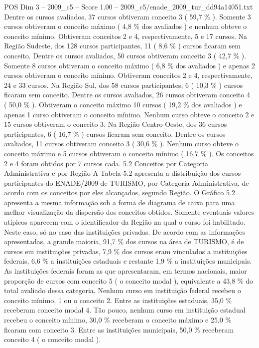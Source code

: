 \begin{textsample}{POS Dim 3 – 2009\_c5 – Score 1.00 – 2009\_c5/enade\_2009\_tur\_dd94a14051.txt}
Dentre os cursos avaliados, 37 cursos obtiveram conceito 3 ( 59,7 \% ).
Somente 3 cursos obtiveram o conceito máximo ( 4,8 \% dos avaliados ) e nenhum obteve o conceito mínimo.
Obtiveram conceitos 2 e 4, respectivamente, 5 e 17 cursos.
Na Região Sudeste, dos 128 cursos participantes, 11 ( 8,6 \% ) cursos ficaram sem conceito.
Dentre os cursos avaliados, 50 cursos obtiveram conceito 3 ( 42,7 \% ).
Somente 8 cursos obtiveram o conceito máximo ( 6,8 \% dos avaliados ) e apenas 2 cursos obtiveram o conceito mínimo.
Obtiveram conceitos 2 e 4, respectivamente, 24 e 33 cursos.
Na Região Sul, dos 58 cursos participantes, 6 ( 10,3 \% ) cursos ficaram sem conceito.
Dentre os cursos avaliados, 26 cursos obtiveram conceito 4 ( 50,0 \% ).
Obtiveram o conceito máximo 10 cursos ( 19,2 \% dos avaliados ) e apenas 1 curso obtiveram o conceito mínimo.
Nenhum curso obteve o conceito 2 e 15 cursos obtiveram o conceito 3.
Na Região Centro-Oeste, dos 36 cursos participantes, 6 ( 16,7 \% ) cursos ficaram sem conceito.
Dentre os cursos avaliados, 11 cursos obtiveram conceito 3 ( 30,6 \% ).
Nenhum curso obteve o conceito máximo e 5 cursos obtiveram o conceito mínimo ( 16,7 \% ).
Os conceitos 2 e 4 foram obtidos por 7 cursos cada. 5.2 Conceitos por Categoria Administrativa e por Região A Tabela 5.2 apresenta a distribuição dos cursos participantes do ENADE/2009 de TURISMO, por Categoria Administrativa, de acordo com os conceitos por eles alcançados, segundo Região.
O Gráfico 5.2 apresenta a mesma informação sob a forma de diagrama de caixa para uma melhor visualização da dispersão dos conceitos obtidos.
Somente eventuais valores atípicos aparecem com o identificador da Região na qual o curso foi habilitado.
Neste caso, só no caso das instituições privadas.
De acordo com as informações apresentadas, a grande maioria, 91,7 \% dos cursos na área de TURISMO, é de cursos em instituições privadas, 7,9 \% dos cursos eram vinculados a instituições federais, 6,6 \% a instituições estaduais e restante 1,9 \% a instituições municipais.
As instituições federais foram as que apresentaram, em termos nacionais, maior proporção de cursos com conceito 5 ( o conceito modal ), equivalente a 43,8 \% do total avaliado dessa categoria.
Nenhum curso em instituição federal recebeu o conceito mínimo, 1 ou o conceito 2.
Entre as instituições estaduais, 35,0 \% receberam conceito modal 4.
Tão pouco, nenhum curso em instituição estadual recebeu o conceito mínimo, 30,0 \% receberam o conceito máximo e 25,0 \% ficaram com conceito 3.
Entre as instituições municipais, 50,0 \% receberam conceito 4 ( o conceito modal ).

\end{textsample}
